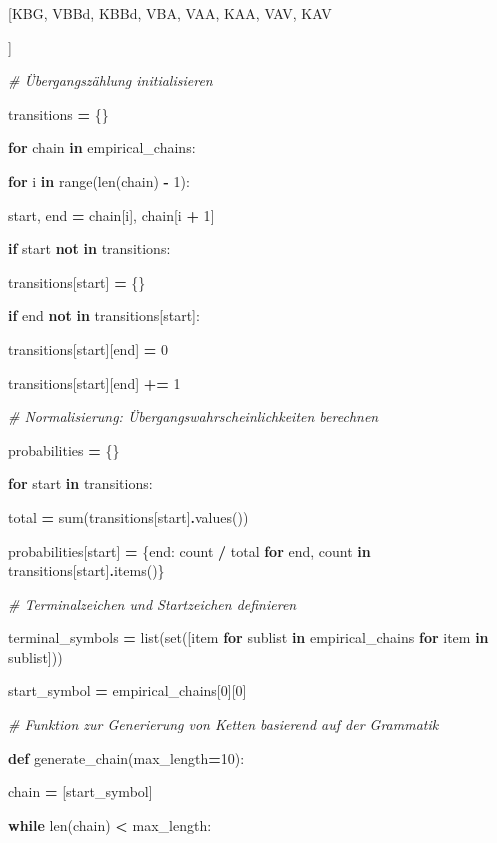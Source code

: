 \documentclass[
]{article}
\begin{document}
{[}\textquotesingle KBG\textquotesingle,
\textquotesingle VBBd\textquotesingle,
\textquotesingle KBBd\textquotesingle,
\textquotesingle VBA\textquotesingle,
\textquotesingle VAA\textquotesingle,
\textquotesingle KAA\textquotesingle,
\textquotesingle VAV\textquotesingle,
\textquotesingle KAV\textquotesingle{]}

{]}

\emph{\# Übergangszählung initialisieren}

transitions \textbf{=} \{\}

\textbf{for} chain \textbf{in} empirical\_chains:

\textbf{for} i \textbf{in} range(len(chain) \textbf{-} 1):

start, end \textbf{=} chain{[}i{]}, chain{[}i \textbf{+} 1{]}

\textbf{if} start \textbf{not} \textbf{in} transitions:

transitions{[}start{]} \textbf{=} \{\}

\textbf{if} end \textbf{not} \textbf{in} transitions{[}start{]}:

transitions{[}start{]}{[}end{]} \textbf{=} 0

transitions{[}start{]}{[}end{]} \textbf{+=} 1

\emph{\# Normalisierung: Übergangswahrscheinlichkeiten berechnen}

probabilities \textbf{=} \{\}

\textbf{for} start \textbf{in} transitions:

total \textbf{=} sum(transitions{[}start{]}\textbf{.}values())

probabilities{[}start{]} \textbf{=} \{end: count \textbf{/} total
\textbf{for} end, count \textbf{in}
transitions{[}start{]}\textbf{.}items()\}

\emph{\# Terminalzeichen und Startzeichen definieren}

terminal\_symbols \textbf{=} list(set({[}item \textbf{for} sublist
\textbf{in} empirical\_chains \textbf{for} item \textbf{in} sublist{]}))

start\_symbol \textbf{=} empirical\_chains{[}0{]}{[}0{]}

\emph{\# Funktion zur Generierung von Ketten basierend auf der
Grammatik}

\textbf{def} generate\_chain(max\_length\textbf{=}10):

chain \textbf{=} {[}start\_symbol{]}

\textbf{while} len(chain) \textbf{\textless{}} max\_length:
\end{document}
